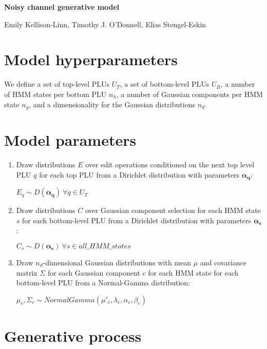 \documentclass[11pt]{article}
\newcommand{\bs}{\boldsymbol}
\newcommand{\myindent}{\hspace{2cm}}
\begin{document}
\begin{center}
	
	{\Large \textbf{Noisy channel generative model}}

	{\normalsize Emily Kellison-Linn, Timothy J. O'Donnell, Elias Stengel-Eskin}
			
\end{center}

\section{Model hyperparameters}

We define a set of top-level PLUs $U_T$, a set of bottom-level PLUs
$U_B$, a number of HMM states per bottom PLU $n_h$, a number of
Gaussian components per HMM state $n_g$, and a dimensionality for the
Gaussian distributions $n_d$.

\section{Model parameters}

\begin{enumerate}

\item Draw distributions $E$ over edit operations conditioned on the
  next top level PLU $q$ for each top PLU from a Dirichlet
  distribution with parameters $\bs{\alpha_q}$:

\myindent $E_q \sim D(\bs{\alpha_{q}}) ~ \forall q \in U_T$

\item Draw distributions $C$ over Gaussian component selection for
  each HMM state $s$ for each bottom-level PLU from a Dirichlet
  distribution with parameters $\bs{\alpha_{s}}$:

\myindent $C_{s} \sim D(\bs{\alpha_{s}}) ~ \forall s \in all\_HMM\_states$

\item Draw $n_d$-dimensional Gaussian distributions with mean $\mu$
  and covariance matrix $\Sigma$ for each Gaussian component $c$ for
  each HMM state for each bottom-level PLU from a Normal-Gamma
  distribution:

  \myindent
  $\mu_c, \Sigma_c \sim NormalGamma(\mu'_c, \lambda_c, \alpha_c,
  \beta_c)$

\end{enumerate}

\section{Generative process}
\end{document}
